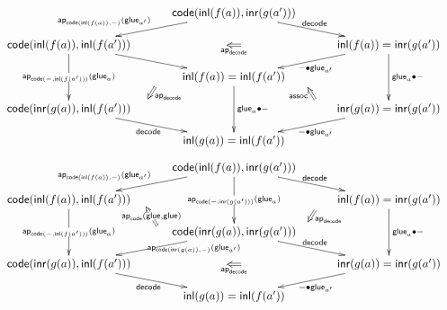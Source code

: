 \documentclass{amsart}
\def\code{\mathsf{code}}
\def\inl{\mathsf{inl}}
\def\inr{\mathsf{inr}}
\def\glue{\mathsf{glue}}
\def\decode{\mathsf{decode}}
\def\ap{\mathsf{ap}}
\def\assoc{\mathsf{assoc}}
\begin{document}
\[\begin{array}{c}\xymatrix@R=1pc@C=1pc{
  && \code(\inl(f(a)),\inr(g(a')))\ar[dll]_{\mathllap{\ap_{\code(\inl(f(a)),-)}(\glue_{a'})}} \ar[drr]^{\decode}
  \ar@{}[dd]_{}="d1" \ar@{=>}"d1"+/^ 0.5pc/;"d1"+/_ 0.5pc/ ^{\ap_{\decode}}
  \\
  \code(\inl(f(a)),\inl(f(a')))\ar[dd]|{\ap_{\code(-,\inl (f(a')))}(\glue_a)}\ar[drr]
   \ar@{}[dddrr]_{}="l1" \ar@{=>}"l1"+/^ 0.5pc/;"l1"+/_ 0.5pc/  ^{\ap_{\decode}}
  &&&&
  \inl(f(a))=\inr(g(a'))\ar[dd]^{\glue_{a}\bullet -}\ar[dll]^{-\bullet \glue_{a'}}
  \ar@{}[dddll]_{}="o1" \ar@{=>}"o1"+/^ 0.5pc/;"o1"+/_ 0.5pc/  ^{\assoc}
  \\
  && \inl(f(a))=\inl(f(a')) \ar[dd]^{\glue_{a}\bullet -} \\
  \code(\inr(g(a)),\inl(f(a')))\ar[drr]_{\decode}
  &&&& \inr(g(a))=\inr(g(a')) \ar[dll]^{-\bullet \glue_{a'}}\\
  && \inl(g(a))=\inl(f(a'))
}\end{array}
\]
\vspace{1cm}
\[
\begin{array}{c}\xymatrix@R=1pc@C=1pc{
  && \code(\inl(f(a)),\inr(g(a')))\ar[dll]_{\mathllap{\ap_{\code(\inl(f(a)),-)}(\glue_{a'})}} \ar[drr]^{\decode} \ar[dd]|{\ap_{\code(-,\inr (g(a')))}(\glue_a)}
  \ar@{}[dddrr]_{}="l2" \ar@{=>}"l2"+/^ 0.5pc/;"l2"+/_ 0.5pc/  ^{\ap_{\decode}}
  \ar@{}[dddll]_{}="o2" \ar@{=>}"o2"+/^ 0.8pc/;"o2"+/_ 0.8pc/  |{\ap_{\code}(\glue,\glue)}
  \\
  \code(\inl(f(a)),\inl(f(a')))\ar[dd]|{\ap_{\code(-,\inl (f(a')))}(\glue_a)}
  &&&&
  \inl(f(a))=\inr(g(a'))\ar[dd]^{\glue_{a}\bullet -}
  \\
  && \code(\inr(g(a)),\inr(g(a')))\ar[dll]|{\ap\mathrlap{{}_{\code(\inr(g(a)),-)}(\glue_{a'})}} \ar[drr]^{\decode}
  \ar@{}[dd]_{}="d2" \ar@{=>}"d2"+/^ 0.5pc/;"d2"+/_ 0.5pc/ ^{\ap_{\decode}}
  \\
  \code(\inr(g(a)),\inl(f(a')))\ar[drr]_{\decode}
  &&&& \inr(g(a))=\inr(g(a')) \ar[dll]^{-\bullet \glue_{a'}}\\
  && \inl(g(a))=\inl(f(a'))
}\end{array}\]
\end{document}

